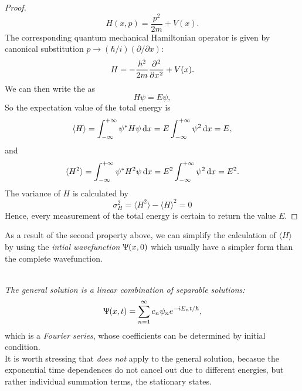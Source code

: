 \begin{proof}
\begin{equation}
H(x,p)=\frac{p^2}{2m}+V(x).
\end{equation}
The corresponding quantum mechanical Hamiltonian operator is given by canonical substitution $p\rightarrow (\hbar/i)(\partial/\partial x)$:
\begin{equation}
 H=-\frac{\hbar^2}{2m}\diffp[2]{}{x}+V(x).
\end{equation}
We can then write the \sch as 
\begin{equation}
 H\psi=E\psi, 
\end{equation}
So the expectation value of the total energy is 
\begin{equation}
\langle H \rangle=\intinf\psi^* H\psi\dx=E\intinf\psi^2\dx=E, 
\end{equation}
and 
\begin{equation}
\langle H^2 \rangle=\intinf \psi^* H^2\psi\dx=E^2\intinf\psi^2\dx=E^2. 
\end{equation}
The variance of $H$ is calculated by
\begin{equation}
\sigma_H^2=\langle H^2 \rangle-\langle H \rangle^2=0
\end{equation}
Hence, every measurement of the total energy is certain to return the value $E$. 
\end{proof}
\begin{coro}
As a result of the second property above, we can simplify the calculation of $\langle H\rangle$ by using the \textit{intial wavefunction} $\Uppsi(x,0)$ which usually have a simpler form than the complete wavefunction. 
\end{coro}
\begin{thrm}
\ \\
\textit{The general solution is a linear combination of separable solutions:}
\begin{equation}
\Uppsi(x,t)=\sum_{n=1}^{\infty}c_n\psi_ne^{-iE_nt/\hbar},
\end{equation}
which is a \textit{Fourier series}, whose coefficients can be determined by initial condition. \\
It is worth stressing that  \textit{does not} apply to the general solution, becasue the exponential time dependences do not cancel out due to different energies, but rather individual summation terms, the stationary states.
\end{thrm}

